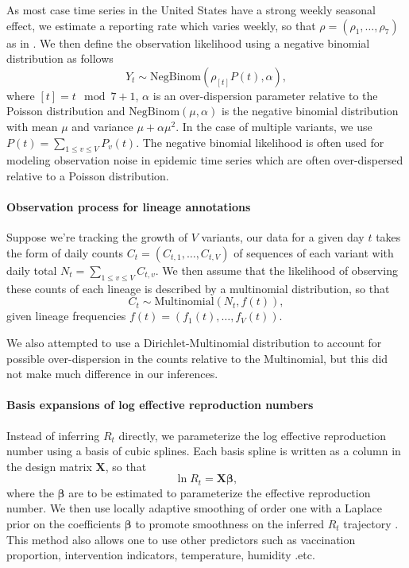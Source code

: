 \documentclass[12pt]{article}
\renewcommand{\vec}[1]{\boldsymbol{#1}}
\begin{document}
As most case time series in the United States have a strong weekly seasonal effect, we estimate a reporting rate which varies weekly, so that $\rho = (\rho_{1}, \ldots, \rho_{7})$ as in \cite{Abbott2020}. 
We then define the observation likelihood using a negative binomial distribution as follows
\begin{equation}
  Y_{t} \sim \text{NegBinom}(\rho_{[t]} P(t),  \alpha),
\end{equation}
where $[t] = t \mod 7 + 1$, $\alpha$ is an over-dispersion parameter relative to the Poisson distribution and $\text{NegBinom}(\mu, \alpha)$ is the negative binomial distribution with mean $\mu$ and variance  $\mu + \alpha\mu^{2}$. In the case of multiple variants, we use $P(t) = \sum_{1\leq v \leq V} P_{v}(t)$. 
The negative binomial likelihood is often used for modeling observation noise in epidemic time series which are often over-dispersed relative to a Poisson distribution. %

\paragraph{Observation process for lineage annotations}%

Suppose we're tracking the growth of $V$ variants, our data for a given day $t$ takes the form of daily counts $C_{t} = (C_{t,1}, \ldots, C_{t,V})$ of sequences of each variant with daily total $N_{t} = \sum_{1\leq v \leq V} C_{t, v}$. 
We then assume that the likelihood of observing these counts of each lineage is described by a multinomial distribution, so that
\begin{equation}
    C_{t} \sim \text{Multinomial}(N_{t}, f(t)),
\end{equation}
given lineage frequencies $f(t) = (f_{1}(t), \ldots, f_{V}(t))$.

We also attempted to use a Dirichlet-Multinomial distribution to account for possible over-dispersion in the counts relative to the Multinomial, but this did not make much difference in our inferences.

\paragraph{Basis expansions of log effective reproduction numbers}%

Instead of inferring $R_{t}$ directly, we parameterize the log effective reproduction number using a basis of cubic splines. 
Each basis spline is written as a column in the design matrix $\vec{X}$, so that 
\begin{equation}
  \ln R_{t} = \vec{X} \vec{\beta},
\end{equation}
where the $\vec{\beta}$ are to be estimated to parameterize the effective reproduction number.
We then use locally adaptive smoothing of order one with a Laplace prior on the coefficients $\vec{\beta}$ to promote smoothness on the inferred $R_t$ trajectory \cite{Faulkner2018}. 
This method also allows one to use other predictors such as vaccination proportion, intervention indicators, temperature, humidity .etc. 
\end{document}
